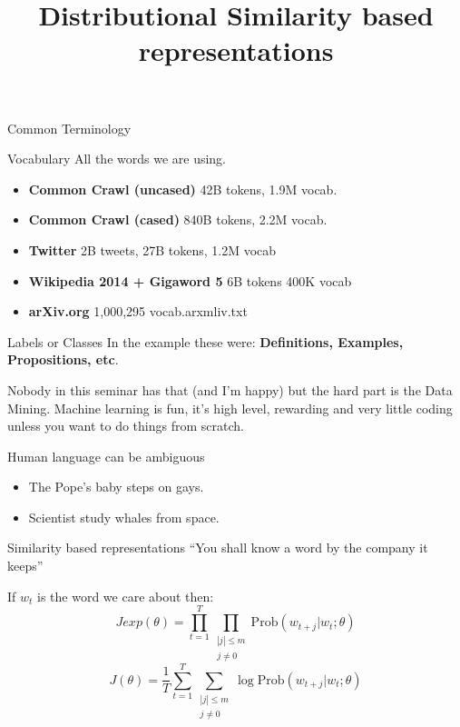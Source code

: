 \documentclass{beamer}
\newcommand{\Prob}{\text{Prob}}
\begin{document}
\begin{frame}{Common Terminology}
    \begin{exampleblock}{Vocabulary}
        All the words we are using.
    \end{exampleblock}
        \begin{itemize}
            \item \textbf{Common Crawl (uncased)} 42B tokens, 1.9M vocab.
            \item \textbf{Common Crawl (cased)} 840B tokens, 2.2M vocab.
            \item \textbf{Twitter} 2B tweets, 27B tokens, 1.2M vocab
            \item \textbf{Wikipedia 2014 + Gigaword 5} 6B tokens 400K vocab
            \item \textbf{arXiv.org} 1,000,295 vocab.arxmliv.txt
        \end{itemize}

        \begin{exampleblock}{Labels or Classes}
            In the example these were: \textbf{Definitions, Examples, Propositions, etc}.
        \end{exampleblock}
\end{frame}

\begin{frame}
Nobody in this seminar has that (and I'm happy) but the hard part is the Data Mining.
Machine learning is fun, it's high level, rewarding and very little coding unless you want to do things from scratch.
\end{frame}

\begin{frame}
    Human language can be ambiguous
    \begin{itemize}
            \item The Pope's baby steps on gays.
            \item Scientist study whales from space.
    \end{itemize}
\end{frame}

\begin{frame}{Similarity based representations}
    ``You shall know a word by the company it keeps''\\[5mm]
    \hspace*{}

\end{frame}

\begin{frame}
    \title{Distributional Similarity based representations}
    If $w_t$ is the word we care about then:
    $$Jexp(\theta) = \prod_{t=1}^T \prod_{\substack{|j|\leq m\\ j\neq 0}} \Prob(w_{t+j}| w_t; \theta)$$
    $$J(\theta) = \frac 1T \sum_{t=1}^T \sum_{\substack{|j|\leq m\\ j\neq 0}}\log \Prob(w_{t+j}| w_t; \theta)$$
\end{frame}
\end{document}
